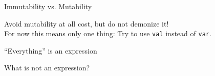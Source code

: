 \begin{frame}{Immutability vs. Mutability}
\begin{center}
Avoid mutability at all cost, but do not demonize it!\\
For now this means only one thing: Try to use \lstinline!val! instead of
\lstinline!var!.
\end{center}
\end{frame}

\begin{frame}{``Everything'' is an expression}

\end{frame}

\begin{frame}{What is not an expression?}

\end{frame}